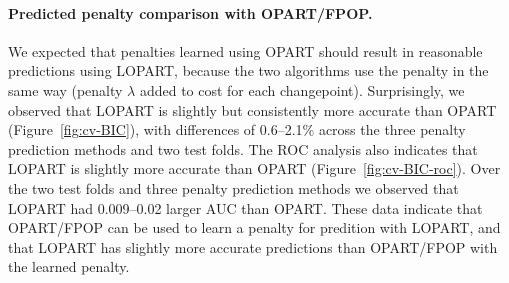\documentclass[12pt]{article}
\begin{document}
\paragraph{Predicted penalty comparison with OPART/FPOP.} 
We expected that penalties learned using OPART should result in reasonable predictions using LOPART, because the two algorithms use the penalty in the same way (penalty $\lambda$ added to cost for each changepoint).
Surprisingly, we observed that LOPART is slightly but consistently more accurate than OPART (Figure~\ref{fig:cv-BIC}), with differences of 0.6--2.1\% across the three penalty prediction methods and two test folds.
The ROC analysis also indicates that LOPART is slightly more accurate than OPART (Figure~\ref{fig:cv-BIC-roc}). Over the two test folds and three penalty prediction methods we observed that LOPART had 0.009--0.02 larger AUC than OPART.
These data indicate that OPART/FPOP can be used to learn a penalty for predition with LOPART, and that LOPART has slightly more accurate predictions than OPART/FPOP with the learned penalty.
\end{document}
